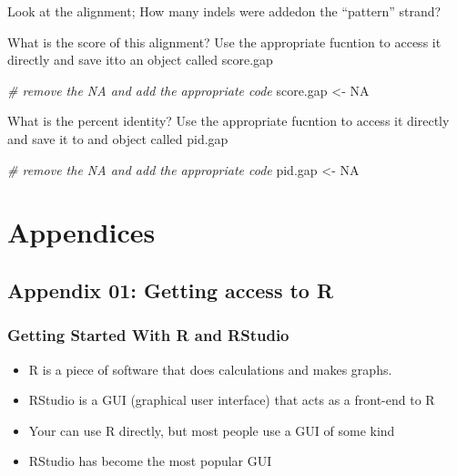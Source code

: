 \documentclass[
]{book}
\newenvironment{Shaded}{\begin{snugshade}}{\end{snugshade}}
\newcommand{\CommentTok}[1]{\textcolor[rgb]{0.56,0.35,0.01}{\textit{#1}}}
\newcommand{\ConstantTok}[1]{\textcolor[rgb]{0.00,0.00,0.00}{#1}}
\newcommand{\NormalTok}[1]{#1}
\newcommand{\OtherTok}[1]{\textcolor[rgb]{0.56,0.35,0.01}{#1}}
\providecommand{\tightlist}{%
  \setlength{\itemsep}{0pt}\setlength{\parskip}{0pt}}
\begin{document}
Look at the alignment; How many indels were addedon the ``pattern'' strand?

What is the score of this alignment? Use the appropriate fucntion to access it directly and save itto an object called score.gap

\begin{Shaded}
\begin{Highlighting}[]
\CommentTok{\# remove the NA and add the appropriate code }
\NormalTok{score.gap }\OtherTok{\textless{}{-}} \ConstantTok{NA}
\end{Highlighting}
\end{Shaded}

What is the percent identity? Use the appropriate fucntion to access it directly and save it to and object called pid.gap

\begin{Shaded}
\begin{Highlighting}[]
\CommentTok{\# remove the NA and add the appropriate code }
\NormalTok{pid.gap }\OtherTok{\textless{}{-}} \ConstantTok{NA}
\end{Highlighting}
\end{Shaded}

\hypertarget{part-appendices}{%
\part{Appendices}\label{part-appendices}}

\hypertarget{section}{%
\subsection*{}\label{section}}

\hypertarget{appendix-01-getting-access-to-r}{%
\chapter*{Appendix 01: Getting access to R}\label{appendix-01-getting-access-to-r}}

\hypertarget{getting-started-with-r-and-rstudio}{%
\section{Getting Started With R and RStudio}\label{getting-started-with-r-and-rstudio}}

\begin{itemize}
\tightlist
\item
  R is a piece of software that does calculations and makes graphs.
\item
  RStudio is a GUI (graphical user interface) that acts as a front-end to R
\item
  Your can use R directly, but most people use a GUI of some kind
\item
  RStudio has become the most popular GUI
\end{itemize}
\end{document}
